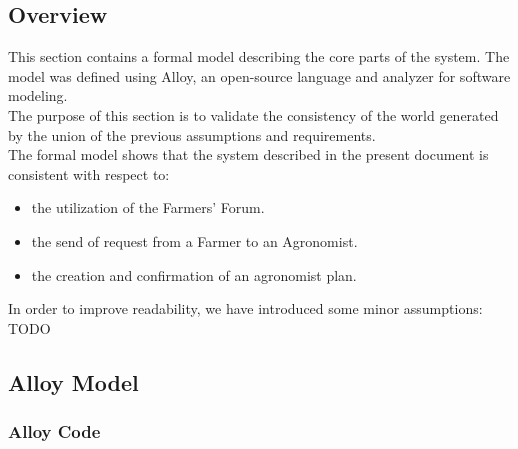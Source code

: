 \subsection{Overview}
\begin{flushleft}
This section contains a formal model describing the core parts of the system. The model was defined using Alloy, an open-source language and analyzer for software modeling.\\
The purpose of this section is to validate the consistency of the world generated by the union of the previous assumptions and requirements.\smallskip\\

The formal model shows that the system described in the present document is consistent with respect to:
\begin{itemize}
	\item the utilization of the Farmers' Forum.
	\item the send of request from a Farmer to an Agronomist.
	\item the creation and confirmation of an agronomist plan.
\end{itemize}

In order to improve readability, we have introduced some minor assumptions:
TODO
\smallskip\\
\end{flushleft}

\subsection{Alloy Model}

\subsubsection{Alloy Code}


